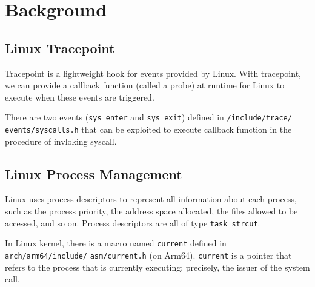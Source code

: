 \section{Background}

\subsection{Linux Tracepoint}



 Tracepoint is a lightweight hook for events provided by Linux. With tracepoint, we can provide a callback function (called a probe) at runtime for Linux to execute when these events are triggered. \cite{torvalds_torvaldslinux_2021,using_tracepoint}

There are two events (\texttt{sys\_enter} and \texttt{sys\_exit}) defined in \texttt{/include/trace/} \texttt{events/syscalls.h} that can be exploited to execute callback function in the procedure of invloking syscall. \cite{torvalds_torvaldslinux_2021}

\subsection{Linux Process Management}

Linux uses process descriptors to represent all information about each process, such as the process priority, the address space allocated, the files allowed to be accessed, and so on. Process descriptors are all of type \texttt{task\_strcut}.  \cite{torvalds_torvaldslinux_2021,bovet_cesati_2006}

In Linux kernel, there is a macro named \texttt{current} defined in \texttt{arch/arm64/include/} \texttt{asm/current.h} (on Arm64). \texttt{current} is a pointer that refers to the process that is currently executing; precisely, the issuer of the system call. \cite{corbet_linux_2005,torvalds_torvaldslinux_2021}
